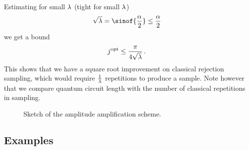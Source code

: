 Estimating for small $\lambda$ (tight for small $\lambda$)
\begin{align*}
    \sqrt{\acceptanceprob} = \sinof{\frac{\rotanglesymbol}{2}}\leq \frac{\rotanglesymbol}{2}
\end{align*}
we get a bound
\begin{align*}
    j^{\mathrm{opt}} \leq \frac{\pi}{4\sqrt{\lambda}} \, .
\end{align*}
This shows that we have a square root improvement on classical rejection sampling, which would require $\frac{1}{\lambda}$ repetitions to produce a sample.
Note however that we compare quantum circuit length with the number of classical repetitions in sampling.

\begin{figure}[t]
    \begin{center}
        
    \end{center}
    \caption{Sketch of the amplitude amplification scheme.}
    \label{fig:rotationSketch}
\end{figure}


\subsection{Examples}










